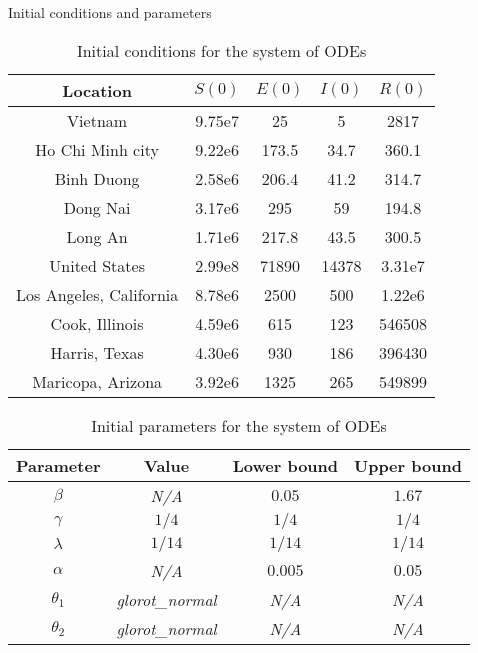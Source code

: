 \begin{frame}[allowframebreaks]{Initial conditions and parameters}

    \begin{table}[h]
        \centering
        \begin{tabular}{| c | c | c | c | c |}
            Location & $S(0)$ & $E(0)$ & $I(0)$ & $R(0)$ \\
            \hline\hline
            Vietnam & 9.75e7 & 25 & 5 & 2817 \\
            \hline
            Ho Chi Minh city & 9.22e6 & 173.5 & 34.7 & 360.1 \\
            \hline
            Binh Duong & 2.58e6 & 206.4 & 41.2 & 314.7 \\
            \hline
            Dong Nai & 3.17e6 & 295 & 59 & 194.8 \\
            \hline
            Long An & 1.71e6 & 217.8 & 43.5 & 300.5 \\
            \hline
            United States & 2.99e8 & 71890 & 14378 & 3.31e7 \\
            \hline
            Los Angeles, California & 8.78e6 & 2500 & 500 & 1.22e6 \\
            \hline
            Cook, Illinois & 4.59e6 & 615 & 123 & 546508 \\
            \hline
            Harris, Texas & 4.30e6 & 930 & 186 & 396430 \\
            \hline
            Maricopa, Arizona & 3.92e6 & 1325 & 265 & 549899 \\
            \hline
        \end{tabular}
        \caption{Initial conditions for the system of ODEs}
        \label{tab:ude-model-initial-conditions}
    \end{table}

    \framebreak

    \begin{table}[h]
        \centering
        \begin{tabular}{| c | c | c | c |}
            Parameter & Value & Lower bound & Upper bound \\
            \hline\hline
            $\beta$ & \textit{N/A} & $0.05$ & $1.67$ \\
            \hline
            $\gamma$ & $1/4$ & $1/4$ & $1/4$ \\
            \hline
            $\lambda$ & $1/14$ & $1/14$ & $1/14$ \\
            \hline
            $\alpha$ & \textit{N/A} & $0.005$ & $0.05$ \\
            \hline
            $\theta_1$ & \textit{glorot\_normal} & \textit{N/A} & \textit{N/A} \\
            \hline
            $\theta_2$ & \textit{glorot\_normal} & \textit{N/A} & \textit{N/A} \\
            \hline
        \end{tabular}
        \caption{Initial parameters for the system of ODEs}
        \label{tab:ude-model-initial-parameters}
    \end{table}

\end{frame}


